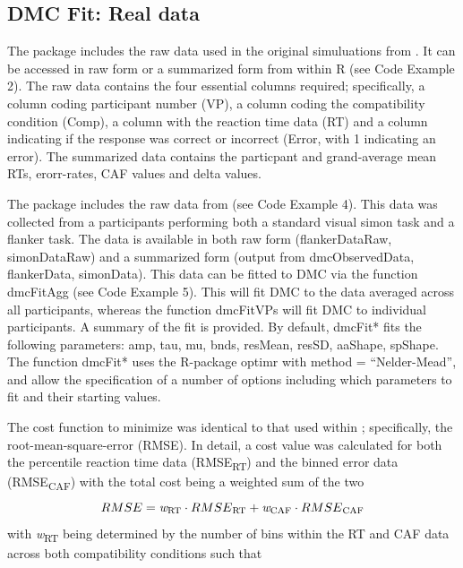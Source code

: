 \subsection{DMC Fit: Real data} 
\label{dmc_fit} 

The package
includes the raw data used in the original simuluations from
\textcite{ulrich2015automatic}. It can be accessed in raw form or a summarized
form from within R (see Code Example 2). The raw data contains the four essential
columns required; specifically, a column coding participant number (VP), a
column coding the compatibility condition (Comp), a column with the reaction
time data (RT) and a column indicating if the response was correct or incorrect
(Error, with 1 indicating an error). The summarized data contains the particpant 
and grand-average mean RTs, erorr-rates, CAF values and delta values. 

The package includes the raw data from \textcite{ulrich2015automatic} (see Code
Example 4). This data was collected from a participants performing both a
standard visual simon task and a flanker task. The data is available in both
raw form (flankerDataRaw, simonDataRaw) and a summarized form (output from
dmcObservedData, flankerData, simonData). This data can be fitted to DMC via
the function dmcFitAgg (see Code Example 5). This will fit DMC to the data
averaged across all participants, whereas the function dmcFitVPs will fit DMC
to individual participants. A summary of the fit is provided. By default,
dmcFit* fits the following parameters: amp, tau, mu, bnds, resMean, resSD,
aaShape, spShape. The function dmcFit* uses the R-package optimr
\parencite{optimr} with method = ``Nelder-Mead'', and allow the specification of a
number of options including which parameters to fit and their starting values. 
   
The cost function to minimize was identical to that used within
\textcite{ulrich2015automatic}; specifically, the root-mean-square-error
(RMSE). In detail, a cost value was calculated for both the percentile reaction time data
(RMSE\textsubscript{RT}) and the binned error data (RMSE\textsubscript{CAF}) with the
total cost being a weighted sum of the two
\begin{equation*}
    RMSE = \textit{w}\textsubscript{RT} \cdot RMSE\textsubscript{RT} + \textit{w}\textsubscript{CAF} \cdot RMSE\textsubscript{CAF}  
\end{equation*}
with \textit{w}\textsubscript{RT} being determined by the number of bins 
within the RT and CAF data across both compatibility conditions such that 

